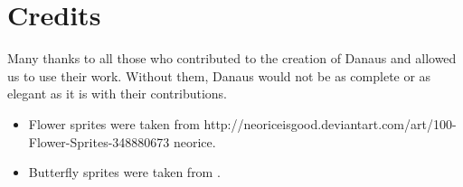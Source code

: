 \documentclass{pset}
\begin{document}
\ifx \CREDITS \undefined \else
\section{Credits}
Many thanks to all those who contributed to the creation of Danaus and allowed
us to use their work. Without them, Danaus would not be as complete or as
elegant as it is with their contributions.

\begin{itemize}
    \item Flower sprites were taken from
        \link
        {http://neoriceisgood.deviantart.com/art/100-Flower-Sprites-348880673}
        {neorice}.
    \item Butterfly sprites were taken from
        . 
\end{itemize}
\fi
\end{document}

